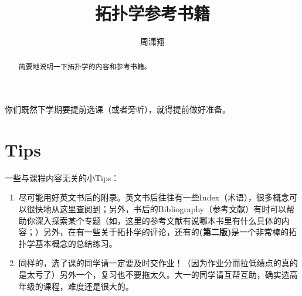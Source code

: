 \documentclass[11pt,A4paper,oneside]{amsart}
\numberwithin{equation}{section}
\theoremstyle{plain}
\theoremstyle{plain}
\numberwithin{equation}{section}
\theoremstyle{remark}
\begin{document}
\title[]{\LARGE 拓扑学参考书籍}


\author[]{\large 周潇翔}
\address{School of Mathematical Sciences\\
University of Science and Technology of China\\
Hefei, 230026\\ P.R. China\\}
\maketitle




\begin{abstract}
简要地说明一下拓扑学的内容和参考书籍。
\end{abstract}





你们既然下学期要提前选课（或者旁听），就得提前做好准备。
\section{Tips}
一些与课程内容无关的小Tips：
\begin{enumerate}
	\item 尽可能用好英文书后的附录。英文书后往往有一些Index（术语），很多概念可以很快地从这里查阅到；另外，书后的Bibliography（参考文献）有时可以帮助你深入探索某个专题（如，\cite{MAA97}这里的参考文献有说哪本书里有什么具体的内容；）另外，在\cite[p577]{EC18}有一些关于拓扑学的评论，还有\cite[Appendix A]{JM08}的\textbf{(第二版)}是一个非常棒的拓扑学基本概念的总结练习。
	\item 同样的，选了课的同学请一定要及时交作业！（因为作业分而拉低绩点的真的是太亏了）另外一个，复习也不要拖太久。大一的同学请互帮互助，确实选高年级的课程，难度还是很大的。
\end{enumerate}
\end{document}

